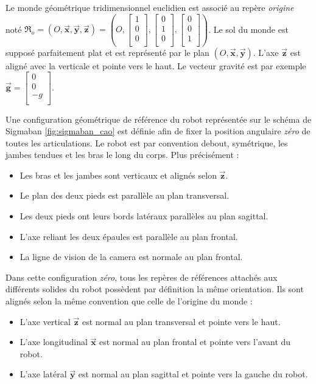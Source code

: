 Le monde géométrique tridimensionnel euclidien est
associé au repère \textit{origine} noté 
$\mathfrak{R}_o = (O, \vec{\bm{x}}, \vec{\bm{y}}, \vec{\bm{z}}) = 
(O, \begin{bmatrix}1\\0\\0\\\end{bmatrix}, \begin{bmatrix}0\\1\\0\\\end{bmatrix}, \begin{bmatrix}0\\0\\1\\\end{bmatrix})$.
Le sol du monde est supposé parfaitement plat et est représenté par le 
plan $(O, \vec{\bm{x}}, \vec{\bm{y}})$. 
L'axe $\vec{\bm{z}}$ est aligné avec la verticale et pointe vers le haut. 
Le vecteur gravité est par exemple $\vec{\bm{g}} = \begin{bmatrix}0\\0\\-g\\\end{bmatrix}$.

Une configuration géométrique de référence du robot
représentée sur le schéma de Sigmaban \ref{fig:sigmaban_cao}
est définie afin de fixer la position angulaire \textit{zéro} 
de toutes les articulations.
Le robot est par convention debout, symétrique, 
les jambes tendues et les bras le long du corps. 
Plus précisément :
\begin{itemize}
    \item Les bras et les jambes sont verticaux et alignés selon $\vec{\bm{z}}$.
    \item Le plan des deux pieds est parallèle au plan transversal.
    \item Les deux pieds ont leurs bords latéraux parallèles au plan sagittal.
    \item L'axe reliant les deux épaules est parallèle au plan frontal.
    \item La ligne de vision de la camera est normale au plan frontal.
\end{itemize}

Dans cette configuration \textit{zéro}, tous les repères de références attachés
aux différents solides du robot possèdent par définition la même orientation.
Ils sont alignés selon la même convention que celle de l'origine du monde :
\begin{itemize}
    \item L'axe vertical $\vec{\bm{z}}$ est normal au plan transversal et pointe vers le haut.
    \item L'axe longitudinal $\vec{\bm{x}}$ est normal au plan frontal et pointe vers l'avant du robot.
    \item L'axe latéral $\vec{\bm{y}}$ est normal au plan sagittal et pointe vers la gauche du robot.
\end{itemize}

